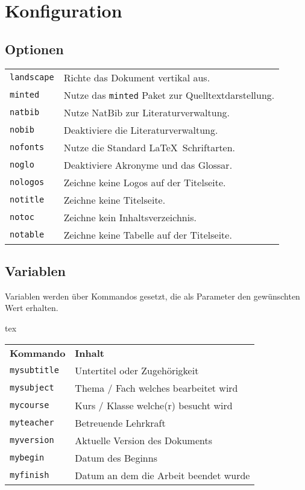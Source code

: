 
\section{Konfiguration}
\subsection{Optionen}
\begin{tabularx}{\textwidth}{l X}
{\small \verb|landscape|}    & Richte das Dokument vertikal aus.\\
{\small \verb|minted|}       & Nutze das \texttt{minted} Paket zur Quelltextdarstellung.\\
{\small \verb|natbib|}       & Nutze NatBib zur Literaturverwaltung.\\
{\small \verb|nobib|}        & Deaktiviere die Literaturverwaltung.\\
{\small \verb|nofonts|}      & Nutze die Standard \LaTeX ~Schriftarten.\\
{\small \verb|noglo|}        & Deaktiviere Akronyme und das Glossar.\\
{\small \verb|nologos|}       & Zeichne keine Logos auf der Titelseite.\\
{\small \verb|notitle|}      & Zeichne keine Titelseite.\\
{\small \verb|notoc|}        & Zeichne kein Inhaltsverzeichnis.\\
{\small \verb|notable|}      & Zeichne keine Tabelle auf der Titelseite.
\end{tabularx}

\subsection{Variablen}
Variablen werden über Kommandos gesetzt, die als Parameter den gewünschten Wert erhalten.
\begin{code}{tex}
\end{code}

\begin{tabular}{l l}
\textbf{Kommando} & \textbf{Inhalt}\\

{\small \verb|mysubtitle|} & Untertitel oder Zugehörigkeit\\
{\small \verb|mysubject|} & Thema / Fach welches bearbeitet wird\\
{\small \verb|mycourse|} & Kurs / Klasse welche(r) besucht wird\\
{\small \verb|myteacher|} & Betreuende Lehrkraft\\
{\small \verb|myversion|} & Aktuelle Version des Dokuments\\
{\small \verb|mybegin|} & Datum des Beginns\\
{\small \verb|myfinish|} & Datum an dem die Arbeit beendet wurde
\end{tabular}


